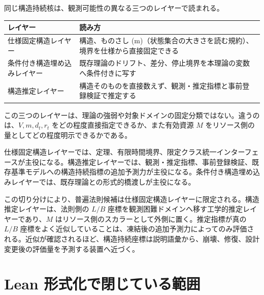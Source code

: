 \documentclass[12pt,a4paper]{article}
\begin{document}
同じ構造持続核は、観測可能性の異なる三つのレイヤーで読まれる。

{\def\LTcaptype{table} %
\begin{longtable}[]{@{}
  >{\raggedright\arraybackslash}p{}
  >{\raggedright\arraybackslash}p{}@{}}
\toprule\noalign{}
\begin{minipage}[b]{\linewidth}\raggedright
レイヤー
\end{minipage} & \begin{minipage}[b]{\linewidth}\raggedright
読み方
\end{minipage} \\
\midrule\noalign{}
\endhead
\bottomrule\noalign{}
\endlastfoot
仕様固定構造レイヤー & 構造、ものさし (m)（状態集合の大きさを読む規約）、境界を仕様から直接固定できる \\
条件付き構造埋め込みレイヤー & 既存理論のドリフト、差分、停止境界を本理論の変数へ条件付きに写す \\
構造推定レイヤー & 構造そのものを直接数えず、観測・推定指標と事前登録検証で推定する \\
\end{longtable}
}

この三つのレイヤーは、理論の強弱や対象ドメインの固定分類ではない。違うのは、\(V,m,d_{t},r_{t}\) をどの程度直接指定できるか、また有効資源 \(M\) をリソース側の量としてどの程度明示できるかである。

仕様固定構造レイヤーでは、定理、有限時間境界、限定クラス統一インターフェースが主役になる。構造推定レイヤーでは、観測・推定指標、事前登録検証、既存基準モデルへの構造持続指標の追加予測力が主役になる。条件付き構造埋め込みレイヤーでは、既存理論との形式的橋渡しが主役になる。

この切り分けにより、普遍法則候補は仕様固定構造レイヤーに限定される。構造推定レイヤーは、法則側の \(L/B\) 座標を観測困難ドメインへ移す工学的推定レイヤーであり、\(M\) はリソース側のスカラーとして外側に置く。推定指標が真の \(L/B\) 座標をよく近似していることは、凍結後の追加予測力によってのみ評価される。近似が確認されるほど、構造持続座標は説明語彙から、崩壊、修復、設計変更後の評価量を予測する装置へ近づく。

\section{Lean 形式化で閉じている範囲}\label{lean-ux5f62ux5f0fux5316ux3067ux9589ux3058ux3066ux3044ux308bux7bc4ux56f2}
\end{document}

